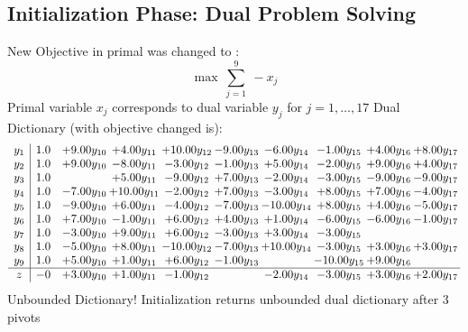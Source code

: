 \documentclass[9pt]{article}
\begin{document}
\subsection{Initialization Phase: Dual Problem Solving}
New Objective in primal was changed to : \[ \max\ \sum_{j=1}^{9}\ - x_j \] 
Primal variable $x_j$ corresponds to dual variable $y_j$ for $j = 1,\ldots,17$
Dual Dictionary (with objective changed is): 
\[\begin{array}{c| c c@{\hskip 2pt} c@{\hskip 2pt} c@{\hskip 2pt} c@{\hskip 2pt} c@{\hskip 2pt} c@{\hskip 2pt} c@{\hskip 2pt} c@{\hskip 2pt} }
 y_{1}   &  1.0 & +  9.00 y_{10} & +  4.00 y_{11} & + 10.00 y_{12} & -9.00 y_{13} & -6.00 y_{14} & -1.00 y_{15} & +  4.00 y_{16} & +  8.00 y_{17}\\
 y_{2}   &  1.0 & +  9.00 y_{10} & -8.00 y_{11} & -3.00 y_{12} & -1.00 y_{13} & +  5.00 y_{14} & -2.00 y_{15} & +  9.00 y_{16} & +  4.00 y_{17}\\
 y_{3}   &  1.0  &   & +  5.00 y_{11} & -9.00 y_{12} & +  7.00 y_{13} & -2.00 y_{14} & -3.00 y_{15} & -9.00 y_{16} & -9.00 y_{17}\\
 y_{4}   &  1.0 & -7.00 y_{10} & + 10.00 y_{11} & -2.00 y_{12} & +  7.00 y_{13} & -3.00 y_{14} & +  8.00 y_{15} & +  7.00 y_{16} & -4.00 y_{17}\\
 y_{5}   &  1.0 & -9.00 y_{10} & +  6.00 y_{11} & -4.00 y_{12} & -7.00 y_{13} & -10.00 y_{14} & +  8.00 y_{15} & +  4.00 y_{16} & -5.00 y_{17}\\
 y_{6}   &  1.0 & +  7.00 y_{10} & -1.00 y_{11} & +  6.00 y_{12} & +  4.00 y_{13} & +  1.00 y_{14} & -6.00 y_{15} & -6.00 y_{16} & -1.00 y_{17}\\
 y_{7}   &  1.0 & -3.00 y_{10} & +  9.00 y_{11} & +  6.00 y_{12} & -3.00 y_{13} & +  3.00 y_{14} & -3.00 y_{15} &    &   \\
 y_{8}   &  1.0 & -5.00 y_{10} & +  8.00 y_{11} & -10.00 y_{12} & -7.00 y_{13} & + 10.00 y_{14} & -3.00 y_{15} & +  3.00 y_{16} & +  3.00 y_{17}\\
 y_{9}   &  1.0 & +  5.00 y_{10} & +  1.00 y_{11} & +  6.00 y_{12} & -1.00 y_{13} &   & -10.00 y_{15} & +  9.00 y_{16} &   \\
\hline
z    &  -0 & +  3.00 y_{10} & +  1.00 y_{11} & -1.00 y_{12} &   & -2.00 y_{14} & -3.00 y_{15} & +  3.00 y_{16} & +  2.00 y_{17}\\
\end{array}\]
Unbounded Dictionary!
Initialization returns unbounded dual dictionary after 3 pivots
\end{document}
